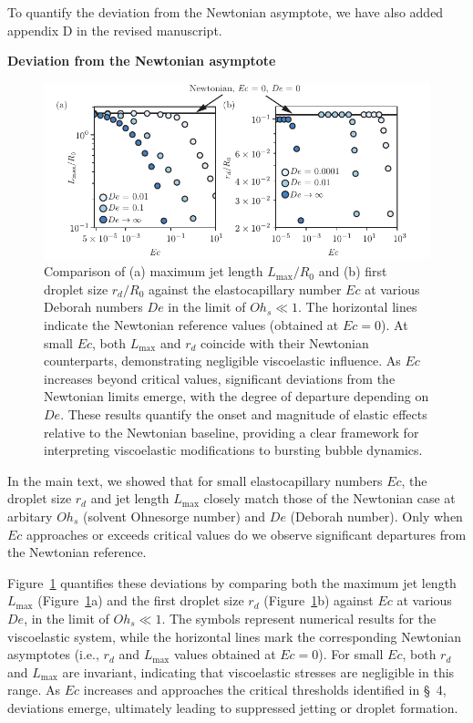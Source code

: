 \documentclass[]{article}
\newcommand{\oo}{\color{magenta} \normalfont}
\newcommand{\bb}{\color{black} \normalfont}
\begin{document}
\begin{enumerate}
        To quantify the deviation from the Newtonian asymptote, we have also added appendix D in the revised manuscript. 

        \oo
        \textbf{Deviation from the Newtonian asymptote}

        \begin{figure}
            \centering
            \includegraphics[width=\textwidth]{../Main/LMaxRd-eps-converted-to.pdf}
            \caption{{\oo Comparison of (a) maximum jet length $L_{\text{max}}/R_0$ and (b) first droplet size $r_d/R_0$ against the elastocapillary number $Ec$ at various Deborah numbers $De$ in the limit of $Oh_s \ll 1$. The horizontal lines indicate the Newtonian reference values (obtained at $Ec=0$). At small $Ec$, both $L_{\text{max}}$ and $r_d$ coincide with their Newtonian counterparts, demonstrating negligible viscoelastic influence. As $Ec$ increases beyond critical values, significant deviations from the Newtonian limits emerge, with the degree of departure depending on $De$. These results quantify the onset and magnitude of elastic effects relative to the Newtonian baseline, providing a clear framework for interpreting viscoelastic modifications to bursting bubble dynamics.\bb}}
            \label{fig:devNewt}
        \end{figure}

        In the main text, we showed that for small elastocapillary numbers $Ec$, the droplet size $r_d$ and jet length $L_{\text{max}}$ closely match those of the Newtonian case at arbitary $Oh_s$ (solvent Ohnesorge number) and $De$ (Deborah number). Only when $Ec$ approaches or exceeds critical values do we observe significant departures from the Newtonian reference.

        Figure~\ref{fig:devNewt} quantifies these deviations by comparing both the maximum jet length $L_{\text{max}}$ (Figure~\ref{fig:devNewt}a) and the first droplet size $r_d$ (Figure~\ref{fig:devNewt}b) against $Ec$ at various $De$, in the limit of $Oh_s \ll 1$. The symbols represent numerical results for the viscoelastic system, while the horizontal lines mark the corresponding Newtonian asymptotes (i.e., $r_d$ and $L_{\text{max}}$ values obtained at $Ec=0$). For small $Ec$, both $r_d$ and $L_{\text{max}}$ are invariant, indicating that viscoelastic stresses are negligible in this range. As $Ec$ increases and approaches the critical thresholds identified in \S~4, deviations emerge, ultimately leading to suppressed jetting or droplet formation.


\end{enumerate}
\end{document}

